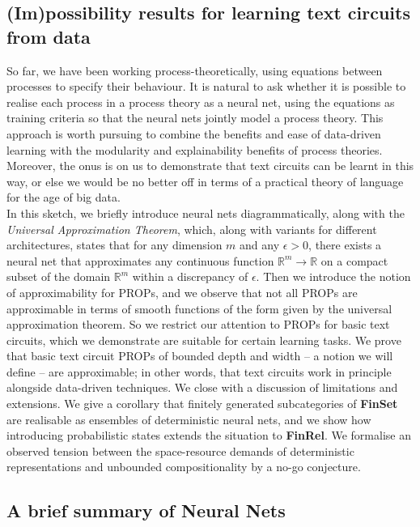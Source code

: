 \begin{fullwidth}

\section{(Im)possibility results for learning text circuits from data}

So far, we have been working process-theoretically, using equations between processes to specify their behaviour. It is natural to ask whether it is possible to realise each process in a process theory as a neural net, using the equations as training criteria so that the neural nets jointly model a process theory. This approach is worth pursuing to combine the benefits and ease of data-driven learning with the modularity and explainability benefits of process theories. Moreover, the onus is on us to demonstrate that text circuits can be learnt in this way, or else we would be no better off in terms of a practical theory of language for the age of big data.\\

In this sketch, we briefly introduce neural nets diagrammatically, along with the \emph{Universal Approximation Theorem}, which, along with variants for different architectures, states that for any dimension $m$ and any $\epsilon > 0$, there exists a neural net that approximates any continuous function $\mathbb{R}^m \rightarrow \mathbb{R}$ on a compact subset of the domain $\mathbb{R}^m$ within a discrepancy of $\epsilon$. Then we introduce the notion of approximability for PROPs, and we observe that not all PROPs are approximable in terms of smooth functions of the form given by the universal approximation theorem. So we restrict our attention to PROPs for basic text circuits, which we demonstrate are suitable for certain learning tasks. We prove that basic text circuit PROPs of bounded depth and width -- a notion we will define -- are approximable; in other words, that text circuits work in principle alongside data-driven techniques. We close with a discussion of limitations and extensions. We give a corollary that finitely generated subcategories of \textbf{FinSet} are realisable as ensembles of deterministic neural nets, and we show how introducing probabilistic states extends the situation to \textbf{FinRel}. We formalise an observed tension between the space-resource demands of deterministic representations and unbounded compositionality by a no-go conjecture.

\subsection{A brief summary of Neural Nets}


\end{fullwidth}
